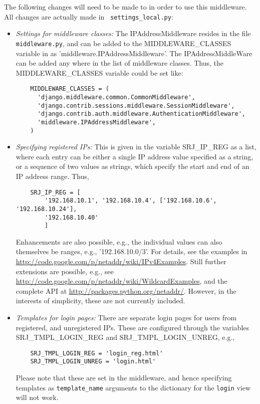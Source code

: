 The following changes will need to be made to \settings in order
to use this middleware. All changes are actually made in {\tt
  settings\_local.py}:
\begin{itemize}
\item\emph{Settings for middleware classes: } The
  IPAddressMiddleware resides in the file {\tt middleware.py},
  and can be added to the MIDDLEWARE\_CLASSES variable in
  \settings as 'middleware.IPAddressMiddleware'. The
  IPAddressMiddleWare can be added any where in the list of
  middleware classes. Thus, the MIDDLEWARE\_CLASSES variable could
  be set like:
  \begin{Verbatim}
    MIDDLEWARE_CLASSES = (
      'django.middleware.common.CommonMiddleware',
      'django.contrib.sessions.middleware.SessionMiddleware',
      'django.contrib.auth.middleware.AuthenticationMiddleware',
      'middleware.IPAddressMiddleware',
    )
  \end{Verbatim}
\item\emph{Specifying registered IPs: } This is given in the
  variable SRJ\_IP\_REG as a list, where each entry can be either a
  single IP address value specified as a string, or a sequence of
  two values as strings, which specify the start and end of an IP
  address range. Thus,
  \begin{Verbatim}
    SRJ_IP_REG = [
        '192.168.10.1', '192.168.10.4', ['192.168.10.6', '192.168.10.24'],
        '192.168.10.40'
        ]
  \end{Verbatim}
  Enhancements are also possible, e.g., the individual values can
  also themselves be ranges, e.g., '192.168.10.0/3'. For details,
  see the examples in
  \url{http://code.google.com/p/netaddr/wiki/IPv4Examples}. Still
  further extensions are possible, e.g., see
  \url{http://code.google.com/p/netaddr/wiki/WildcardExamples},
  and the complete API at
  \url{http://packages.python.org/netaddr/}. However, in the
  interests of simplicity, these are not currently included.
\item\emph{Templates for login pages: } There are separate login
  pages for users from registered, and unregistered IPs. These
  are configured through the variables SRJ\_TMPL\_LOGIN\_REG and
  SRJ\_TMPL\_LOGIN\_UNREG, e.g.,
  \begin{Verbatim}
    SRJ_TMPL_LOGIN_REG = 'login_reg.html'
    SRJ_TMPL_LOGIN_UNREG = 'login.html'
  \end{Verbatim}
  Please note that these are set in the middleware, and hence
  specifying templates as {\tt template\_name} arguments to the
  dictionary for the {\tt login} view will not work.
\end{itemize}
